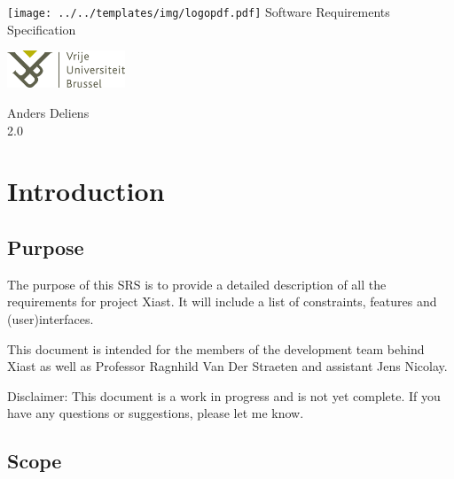 \documentclass[12pt]{article}
\newcommand{\DocumentName}{Software Requirements Specification}
\newcommand{\Title}{\DocumentName \\ \hfill}
\newcommand{\Author}{Anders Deliens}
\newcommand{\Version}{2.0}
\begin{document}
\begin{titlepage}

\begin{center}
\texttt{[image: ../../templates/img/logopdf.pdf]}
\vfill
{\Huge \Title}
\hfill
\vfill
\vfill
\end{center}

\begin{minipage}[t]{1\textwidth}
\begin{flushleft}
\includegraphics[width=100pt]{../../templates/img/VUB_logo_compact.jpg}
\end{flushleft}
\end{minipage}

\begin{minipage}[t]{1\textwidth}
\begin{flushright}
\Author \\
\Version \\
\end{flushright}
\end{minipage}

\end{titlepage}

\section{Introduction}\label{introduction}

\subsection{Purpose}\label{purpose}

The purpose of this SRS is to provide a detailed description of all the
requirements for project Xiast. It will include a list of constraints,
features and (user)interfaces.

This document is intended for the members of the development team behind
Xiast as well as Professor Ragnhild Van Der Straeten and assistant Jens
Nicolay.

Disclaimer: This document is a work in progress and is not yet complete.
If you have any questions or suggestions, please let me know.

\subsection{Scope}\label{scope}
\end{document}
